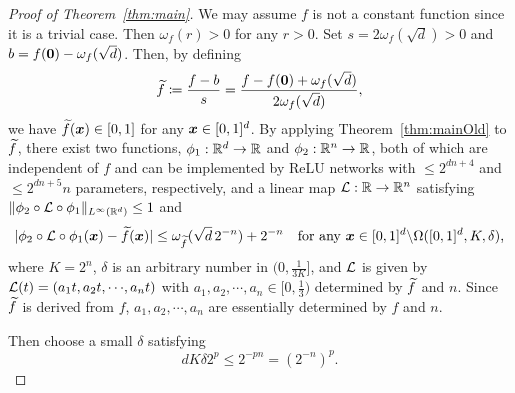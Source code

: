 \documentclass[nohyperref]{article}
\theoremstyle{plain}
\theoremstyle{definition}
\theoremstyle{remark}
\begin{document}
\begin{proof}[Proof of Theorem~\ref{thm:main}]
	We may assume $f$ is not a constant function  since it is a trivial case. 
	Then $\omega_f(r)>0$ for any $r>0$. Set $s=2\omega_f(\sqrt{d})>0$ and $b=f({\bm{0}})-\omega_f(\sqrt{d})$. Then, by defining 
	\begin{equation*}
		{\widetilde{f}}\coloneqq \frac{f-b}{s}=\frac{f-f({\bm{0}})+\omega_f(\sqrt{d})}{2\omega_f(\sqrt{d})},
	\end{equation*}
	we have ${\widetilde{f}}({\bm{x}})\in [0,1]$ for any ${\bm{x}}\in [0,1]^d$. 
	By applying Theorem~\ref{thm:mainOld} to ${\widetilde{f}}$, there exist two  functions, $\phi_1:\R^d\to \R$ and $\phi_2:\R^n\to \R$, both of which are independent of $f$ and can be implemented by ReLU networks with $\le 2^{dn+4}$ and $\le 2^{dn+5}n$ parameters, respectively, and a linear map $\calL:\R\to \R^n$ satisfying $\|\phi_2\circ \calL \circ\phi_1\|_{L^\infty(\R^d)}\le 1$  and
	\begin{equation*}
		|\phi_2\circ {\mathcal{L}} \circ\phi_1({\bm{x}})-{\widetilde{f}}({\bm{x}})|\le \omega_{\widetilde{f}}(\sqrt{d}\, 2^{-n})+2^{-n}\quad \textnormal{for any ${\bm{x}}\in [0,1]^d\backslash \Omega([0,1]^d,K,\delta)$,}
	\end{equation*}
	where $K=2^n$, $\delta$ is an arbitrary number in $(0,\tfrac{1}{3K}]$, and ${\mathcal{L}}$ is given by $\calL(t)=(a_1t, a_2 t,\cdots,a_n t)$ with $a_1,a_2,\cdots,a_n\in [0,\tfrac{1}{3})$ determined by ${\widetilde{f}}$ and $n$. Since ${\widetilde{f}}$ is derived from $f$, $a_1,a_2,\cdots,a_n$ are essentially determined by $f$ and $n$.
	
	Then choose a small $\delta$ satisfying 
	\begin{equation*}
		dK\delta 2^p \le 2^{-pn}= (2^{-n})^p.
	\end{equation*}
	

\end{proof}
\end{document}
